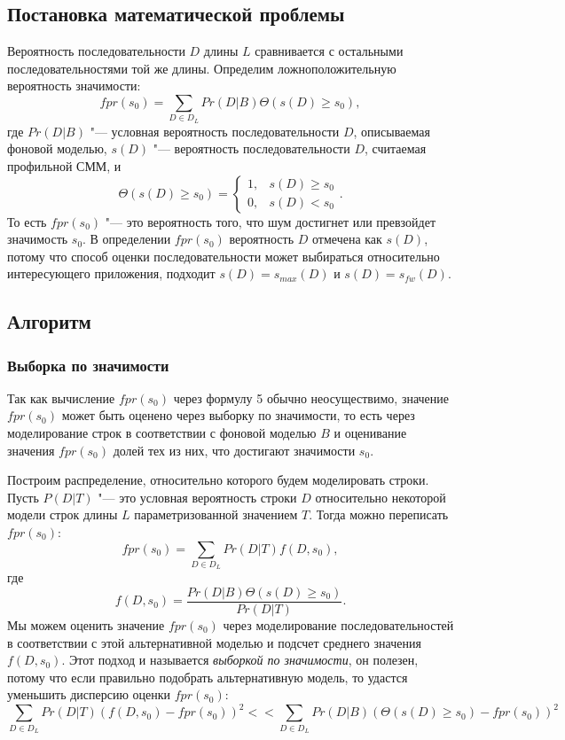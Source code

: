 \documentclass[specialist,
substylefile = spbu_report.rtx,
subf,href,colorlinks=true, 12pt]{disser}
\begin{document}
			\subsection{Постановка математической проблемы}
			Вероятность последовательности $D$ длины $L$ сравнивается с остальными последовательностями той же длины. Определим ложноположительную вероятность значимости:
			\begin{equation}
				fpr(s_{0}) =  \sum_{D \in D_{L}} Pr(D|B) \Theta(s(D) \geq s_{0}),
			\end{equation}
			где $Pr(D|B)$ "--- условная вероятность последовательности $D$, описываемая фоновой моделью, $s(D)$ "--- вероятность последовательности $D$, считаемая профильной СММ, и
			\[
				 \Theta(s(D) \geq s_{0}) = 
				 \begin{cases}
				 	1, & s(D) \geq s_{0}\\
				 	0, & s(D) < s_{0}
				 \end{cases}.
			\]
			То есть $fpr(s_{0})$ "--- это вероятность того, что шум достигнет или превзойдет значимость $s_{0}$. В определении $fpr(s_{0})$ вероятность $D$ отмечена как $s(D)$, потому что способ оценки последовательности может выбираться относительно интересующего приложения, подходит $s(D) = s_{max}(D)$ и $s(D) = s_{fw}(D)$.
			
			\subsection{Алгоритм}
			\subsubsection{Выборка по значимости}
			Так как вычисление $fpr(s_{0})$ через формулу 5 обычно неосуществимо, значение $fpr(s_{0})$ может быть оценено через выборку по значимости, то есть через моделирование строк в соответствии с фоновой моделью $B$ и оценивание значения $fpr(s_{0})$ долей тех из них, что достигают значимости $s_{0}$.
			
			Построим распределение, относительно которого будем моделировать строки. Пусть $P(D|T)$ "--- это условная вероятность строки $D$ относительно некоторой модели строк длины $L$ параметризованной значением $T$. Тогда можно переписать $fpr(s_{0})$:
			\begin{equation}
				fpr(s_{0}) = \sum_{D \in D_{L}} Pr(D|T) f(D,s_{0}),
			\end{equation}
			где
			\begin{equation}
				f(D,s_{0}) = \frac{Pr(D|B) \Theta(s(D) \geq s_{0})}{Pr(D|T)}.
			\end{equation}
			Мы можем оценить значение $fpr(s_{0})$ через моделирование последовательностей в соответствии с этой альтернативной моделью и подсчет среднего значения $f(D,s_{0})$. Этот подход и называется \textit{выборкой по значимости}, он полезен, потому что если правильно подобрать альтернативную модель, то удастся уменьшить дисперсию оценки $fpr(s_{0})$:
			\begin{equation}
				\sum_{D \in D_{L}}Pr(D|T)(f(D, s_{0})-fpr(s_{0}))^{2} <\!\!< \sum_{D \in D_{L}}Pr(D|B)(\Theta(s(D) \geq s_{0})-fpr(s_{0}))^2
			\end{equation}
		
\end{document}
